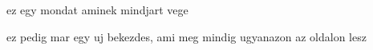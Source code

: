 ez egy mondat aminek mindjart vege

ez pedig mar egy uj bekezdes, ami meg mindig ugyanazon az oldalon lesz

\tracingall

\bye
